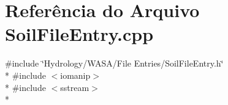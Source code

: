 \section{Referência do Arquivo Soil\+File\+Entry.\+cpp}
\label{_soil_file_entry_8cpp}
{\ttfamily \#include \char`\"{}Hydrology/\+W\+A\+S\+A/\+File Entries/\+Soil\+File\+Entry.\+h\char`\"{}}\\*
{\ttfamily \#include $<$iomanip$>$}\\*
{\ttfamily \#include $<$sstream$>$}\\*
